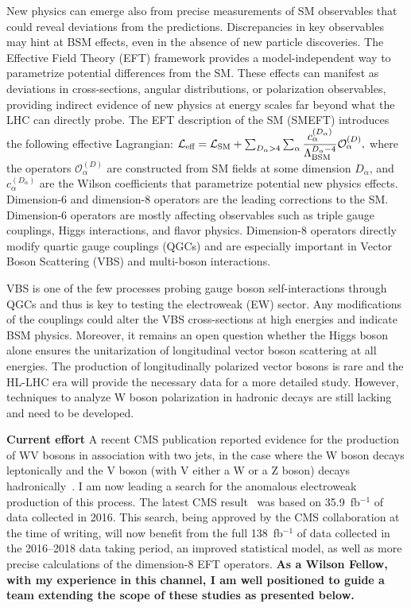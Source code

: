 {\begin{flushleft}
New physics can emerge also from precise measurements of SM observables that could reveal deviations from the predictions. Discrepancies in key observables may hint at BSM effects, even in the absence of new particle discoveries. The Effective Field Theory (EFT) framework provides a model-independent way to parametrize potential differences from the SM. These effects can manifest as deviations in cross-sections, angular distributions, or polarization observables, providing indirect evidence of new physics at energy scales far beyond what the LHC can directly probe.
The EFT description of the SM (SMEFT) introduces the following effective Lagrangian:
\begin{math}
    \mathcal{L}_{\text{eff}} = \mathcal{L}_{\text{SM}} + \sum_{D_\alpha>4}\sum_{\alpha}\dfrac{c_\alpha^{(D_\alpha)}}{\Lambda_{\text{BSM}}^{D_\alpha-4}}\mathcal{O}^{(D)}_\alpha \space,
\end{math}
where the operators $\mathcal{O}_\alpha^{(D)}$ are constructed from SM fields at some dimension $D_\alpha$, and $c_\alpha^{(D_\alpha)}$ are the Wilson coefficients that parametrize potential new physics effects. Dimension-6 and dimension-8 operators are the leading corrections to the SM. Dimension-6 operators are mostly affecting observables such as triple gauge couplings, Higgs interactions, and flavor physics. Dimension-8 operators directly modify quartic gauge couplings (QGCs) and are especially important in Vector Boson Scattering (VBS) and multi-boson interactions. 

VBS is one of the few processes probing gauge boson self-interactions through QGCs and thus is key to testing the electroweak (EW) sector. Any modifications of the couplings could alter the VBS cross-sections at high energies and indicate BSM physics.  
Moreover, it remains an open question whether the Higgs boson alone ensures the unitarization of longitudinal vector boson scattering at all energies. The production of longitudinally polarized vector bosons is rare and the HL-LHC era will provide the necessary data for a more detailed study. However, techniques to analyze W boson polarization in hadronic decays are still lacking and need to be developed.

\textbf{Current effort}
A recent CMS publication reported evidence for the production of WV bosons in association with two jets, in the case where the W boson decays leptonically and the V boson (with V either a W or a Z boson) decays hadronically~\cite{[2]}. I am now leading a search for the anomalous electroweak production of this process. The latest CMS result~\cite{[3]} was based on 35.9~fb$^{-1}$ of data collected in 2016. This search, being approved by the CMS collaboration at the time of writing, will now benefit from the full 138~fb$^{-1}$ of data collected in the 2016--2018 data taking period, an improved statistical model, as well as more precise calculations of the dimension-8 EFT operators. {\bf As a Wilson Fellow, with my experience in this channel, I am well positioned to guide a team extending the scope of these studies as presented below.}


\end{flushleft}}
